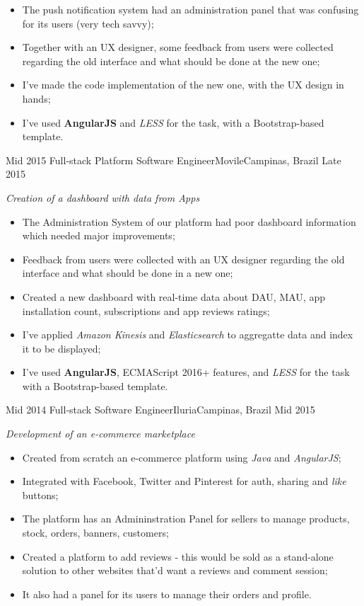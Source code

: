 \begin{experiences}
{\begin{itemize}
            \item The push notification system had an administration panel that was confusing for its users (very tech savvy);
            \item Together with an UX designer, some feedback from users were collected regarding the old interface and what should
            be done at the new one;
            \item I've made the code implementation of the new one, with the UX design in hands;
            \item I've used \textbf{AngularJS} and \emph{LESS} for the task, with a Bootstrap-based template.\\
          \end{itemize}
        }{}
  \experience
  {Mid 2015} {Full-stack Platform Software Engineer}{Movile}{Campinas, Brazil}
  {Late 2015}
        {
        \emph{Creation of a dashboard with data from Apps}\\
          \begin{itemize}
            \item The Administration System of our platform had poor dashboard information which needed major improvements;
            \item Feedback from users were collected with an UX designer regarding the old interface and what should be done in a new one;
            \item Created a new dashboard with real-time data about DAU, MAU, app installation count, subscriptions and app reviews ratings;
            \item I've applied \emph{Amazon Kinesis} and \emph{Elasticsearch} to aggregatte data and index it to be displayed;
            \item I've used \textbf{AngularJS}, ECMAScript 2016+ features, and \emph{LESS} for the task with a Bootstrap-based template.\\
          \end{itemize}
        }{}
  \experience
  {Mid 2014} {Full-stack Software Engineer}{Iluria}{Campinas, Brazil}
  {Mid 2015}
        {
        \emph{Development of an e-commerce marketplace}\\
          \begin{itemize}
            \item Created from scratch an e-commerce platform using \emph{Java} and \emph{AngularJS};
            \item Integrated with Facebook, Twitter and Pinterest for auth, sharing and \emph{like} buttons;
            \item The platform has an Admininstration Panel for sellers to manage products, stock, orders, banners, customers; 
            \item Created a platform to add reviews - this would be sold as a stand-alone solution to other websites that'd want a reviews and comment session;
            \item It also had a panel for its users to manage their orders and profile.\\ 
          \end{itemize}
        }{}
\end{experiences}